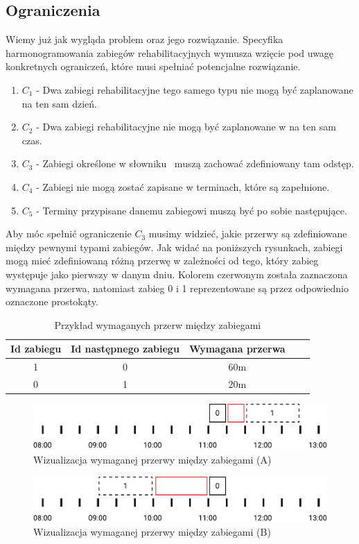 \subsection{Ograniczenia}
\label{constraints}
Wiemy już jak wygląda problem oraz jego rozwiązanie. Specyfika
harmonogramowania zabiegów rehabilitacyjnych wymusza wzięcie pod uwagę
konkretnych ograniczeń, które musi spełniać potencjalne rozwiązanie.
\begin{enumerate}
	\item{$C_1$ - Dwa zabiegi rehabilitacyjne tego samego typu nie mogą być
		zaplanowane na ten sam dzień.}
	\item{$C_2$ - Dwa zabiegi rehabilitacyjne nie mogą być zaplanowane w na ten sam czas.}
	\item{$C_3$ - Zabiegi określone w słowniku \sGap\ muszą zachować zdefiniowany tam odstęp.}
	\item{$C_4$ - Zabiegi nie mogą zostać zapisane w terminach, które są zapełnione.}
	\item{$C_5$ - Terminy przypisane danemu zabiegowi muszą być po sobie
		następujące.}
\end{enumerate}
Aby móc spełnić ograniczenie $C_3$ musimy widzieć, jakie przerwy są zdefiniowane
między pewnymi typami zabiegów. Jak widać na poniższych rysunkach, zabiegi mogą
mieć zdefiniowaną różną przerwę w zależności od tego, który zabieg występuje
jako pierwszy w danym dniu. Kolorem czerwonym została zaznaczona wymagana
przerwa, natomiast zabieg 0 i 1 reprezentowane są przez odpowiednio oznaczone
prostokąty.
\begin{table}[h]
	\centering
	\begin{tabular}{ | c | c | c | c | c | }
		\hline
		\bfseries Id zabiegu & \bfseries Id następnego zabiegu & \bfseries Wymagana przerwa \\
		\hline
		1 & 0 & 60m \\
		\hline
		0 & 1 & 20m \\
		\hline
	\end{tabular}
	\caption{Przykład wymaganych przerw między zabiegami}
	\label{example-gaps}
\end{table}
\begin{figure}[h]
	\centering
	\includegraphics[width=\textwidth]{gfx/gap_1.pdf}
	\caption{Wizualizacja wymaganej przerwy między zabiegami (A)}
	\label{example-gaps-1}
\end{figure}
\begin{figure}[h]
	\centering
	\includegraphics[width=\textwidth]{gfx/gap_2.pdf}
	\caption{Wizualizacja wymaganej przerwy między zabiegami (B)}
	\label{example-gaps-2}
\end{figure}
\newpage
